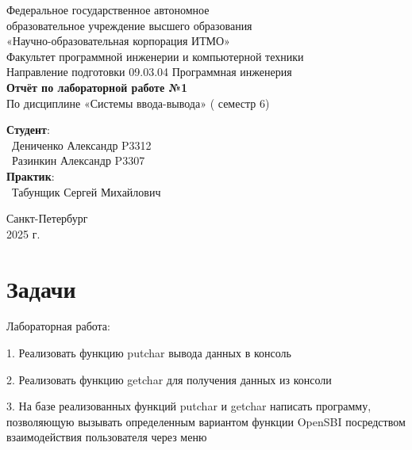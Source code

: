 \documentclass{article}
\begin{document}
\begin{center}
    \Large
    Федеральное государственное автономное \\
    образовательное учреждение высшего образования \\ 
    «Научно-образовательная корпорация ИТМО»\\
    \vspace{0.5cm}
    \large
    Факультет программной инженерии и компьютерной техники \\
    Направление подготовки 09.03.04 Программная инженерия \\
    \vspace{1cm}
    \Large
    \textbf{Отчёт по лабораторной работе №1} \\
        По дисциплине «Системы ввода-вывода» ( семестр 6)\\
    \large
    \vspace{8cm}

    \begin{minipage}{.33\textwidth}
    \end{minipage}
    \hfill
    \begin{minipage}{.4\textwidth}
    
        \textbf{Студент}: \vspace{.1cm} \\
        \ Дениченко Александр P3312\\
        \ Разинкин Александр P3307\\
        \textbf{Практик}:  \\
        \ Табунщик Сергей Михайлович
    \end{minipage}
    \vfill
Санкт-Петербург\\ 2025 г.
\end{center}
\pagestyle{empty}
\newpage
\pagestyle{plain}

\section*{Задачи}
Лабораторная работа:

1. Реализовать функцию putchar вывода данных в консоль

2. Реализовать функцию getchar для получения данных из консоли

3. На базе реализованных функций putchar и getchar написать программу,
позволяющую вызывать определенным вариантом функции OpenSBI
посредством взаимодействия пользователя через меню
\end{document}
